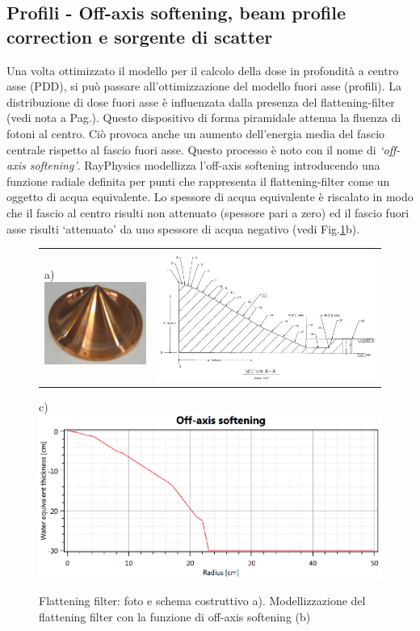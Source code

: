 \subsection{Profili - Off-axis softening, beam profile correction e sorgente di scatter}
Una volta ottimizzato il modello per il calcolo della dose in profondità a centro asse (PDD), si può passare all'ottimizzazione del modello fuori asse (profili). La distribuzione di dose fuori asse è influenzata dalla presenza del flattening-filter (vedi nota a Pag.\pageref{foot:flatt}). Questo dispositivo di forma piramidale attenua la fluenza di fotoni al centro. Ciò provoca anche un aumento dell'energia media del fascio centrale rispetto al fascio fuori asse. Questo processo è noto con il nome di \textit{`off-axis softening'}. RayPhysics modellizza l'off-axis softening introducendo una funzione radiale definita per punti che rappresenta il flattening-filter come un oggetto di acqua equivalente. Lo spessore di acqua equivalente è riscalato in modo che il fascio al centro risulti non attenuato (spessore pari a zero) ed il fascio fuori asse risulti `attenuato' da uno spessore di acqua negativo (vedi Fig.\ref{fig:Ray_flatt}b).
\begin{figure}[!t]
\centering
\begin{tabular}{m{}m{}}
\vspace*{-0.5cm}a)\includegraphics[width=.3\textwidth]{./cap2/Ray_flatt1.png} &
\includegraphics[width=.6\textwidth]{./cap2/Ray_flatt2.png}
\end{tabular}
c)\includegraphics[width=.9\textwidth]{./cap2/Ray_flatt3.png}
\caption{Flattening filter: foto e schema costruttivo a). Modellizzazione del flattening filter con la funzione di off-axis softening (b)}
\label{fig:Ray_flatt}
\end{figure}

